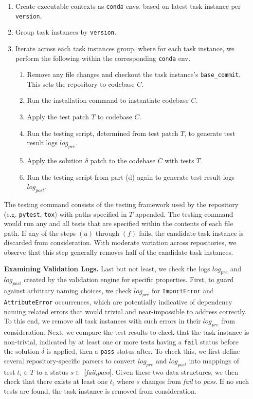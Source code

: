 \begin{enumerate}
    \item Create executable contexts as \texttt{conda} envs. based on latest task instance per \texttt{version}.
    \item Group task instances by \texttt{version}.
    \item Iterate across each task instances group, where for each task instance, we perform the following within the corresponding \texttt{conda} env.
    \begin{enumerate}
        \item Remove any file changes and checkout the task instance's \texttt{base\_commit}. This sets the repository to codebase $C$.
        \item Run the installation command to instantiate codebase $C$.
        \item Apply the test patch $T$ to codebase $C$.
        \item Run the testing script, determined from test patch $T$, to generate test result logs $log_{pre}$.
        \item Apply the solution $\delta$ patch to the codebase $C$ with tests $T$.
        \item Run the testing script from part (d) again to generate test result logs $log_{post}$.
    \end{enumerate}
\end{enumerate}

The testing command consists of the testing framework used by the repository (e.g. \texttt{pytest}, \texttt{tox}) with paths specified in $T$ appended.
The testing command would run any and all tests that are specified within the contents of each file path.
If any of the steps $(a)$ through $(f)$ fails, the candidate task instance is discarded from consideration.
With moderate variation across repositories, we observe that this step generally removes half of the candidate task instances.



\textbf{Examining Validation Logs.}
Last but not least, we check the logs $log_{pre}$ and $log_{post}$ created by the validation engine for specific properties.
First, to guard against arbitrary naming choices, we check $log_{pre}$ for \texttt{ImportError} and \texttt{AttributeError} occurrences, which are potentially indicative of dependency naming related errors that would trivial and near-impossible to address correctly.
To this end, we remove all task instances with such errors in their $log_{pre}$ from consideration.
Next, we compare the test results to check that the task instance is non-trivial, indicated by at least one or more tests having a \texttt{fail} status before the solution $\delta$ is applied, then a \texttt{pass} status after.
To check this, we first define several repository-specific parsers to convert $log_{pre}$ and $log_{post}$ into mappings of test $t_i \in T$ to a status $s \in$ [\textit{fail},\textit{pass}].
Given these two data structures, we then check that there exists at least one $t_i$ where $s$ changes from \textit{fail} to \textit{pass}.
If no such tests are found, the task instance is removed from consideration.

